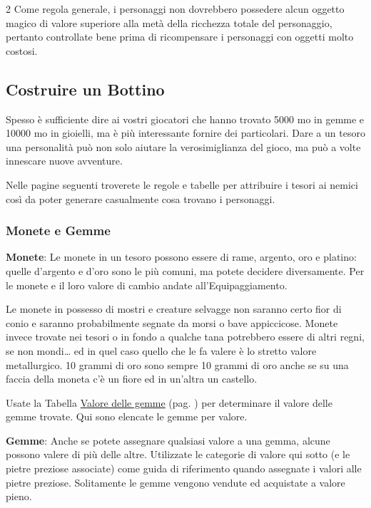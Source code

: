 \begin{multicols}{2}
Come regola generale, i personaggi non dovrebbero possedere alcun oggetto magico di valore superiore alla metà della ricchezza totale del personaggio, pertanto controllate bene prima di ricompensare i personaggi con oggetti molto costosi.

\subsection{Costruire un Bottino}\label{costruireunbottino}

Spesso è sufficiente dire ai vostri giocatori che hanno trovato 5000 mo in gemme e 10000 mo in gioielli, ma è più interessante fornire dei particolari. Dare a un tesoro una personalità può non solo aiutare la verosimiglianza del gioco, ma può a volte innescare nuove avventure.

Nelle pagine seguenti troverete le regole e tabelle per attribuire i tesori ai nemici così da poter generare casualmente cosa trovano i personaggi.

\subsubsection{Monete e Gemme}\label{gemme}

\textbf{Monete}: Le monete in un tesoro possono essere di rame, argento, oro e platino: quelle d'argento e d'oro sono le più comuni, ma potete decidere diversamente. Per le monete e il loro valore di cambio andate all'Equipaggiamento.

Le monete in possesso di mostri e creature selvagge non saranno certo fior di conio e saranno probabilmente segnate da morsi o bave appiccicose. Monete invece trovate nei tesori o in fondo a qualche tana potrebbero essere di altri regni, se non mondi… ed in quel caso quello che le fa valere è lo stretto valore metallurgico. 10 grammi di oro sono sempre 10 grammi di oro anche se su una faccia della moneta c'è un fiore ed in un'altra un castello.

Usate la Tabella \hyperlink{valoredellegemme}{Valore delle gemme} (pag. \pageref{valoredellegemme}) per determinare il valore delle gemme trovate. Qui sono elencate le gemme per valore.

\textbf{Gemme}: Anche se potete assegnare qualsiasi valore a una gemma, alcune possono valere di più delle altre. Utilizzate le categorie di valore qui sotto (e le pietre preziose associate) come guida di riferimento quando assegnate i valori alle pietre preziose. Solitamente le gemme vengono vendute ed acquistate a valore pieno.


\end{multicols}
